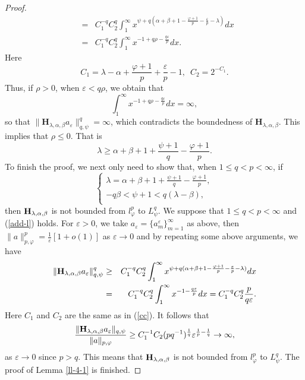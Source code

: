 \documentclass[10pt]{amsart}
\theoremstyle{definition}    %
\numberwithin{equation}{section}
\begin{document}
\begin{proof}
\begin{eqnarray}
&=&  C_1^{-q}C_2^{q}\int_{1}^{\infty}x^{\psi+q(\alpha+\beta+1-\frac{\varphi+1}{p}-\frac{\varepsilon}{p}-\lambda)}dx  \nonumber \\
&=& C_1^{-q}C_2^{q}\int_{1}^{\infty}x^{-1+q\rho-\frac{q\varepsilon}{p}}dx. \nonumber
\end{eqnarray}
Here \begin{equation}\label{cc}C_1=\lambda-\alpha+\frac{\varphi+1}{p}+\frac{\varepsilon}{p}-1, \,\,\, C_2=2^{-C_1}.\end{equation}
Thus, if $\rho>0$, when $\varepsilon<q\rho$, we obtain that $$\int_{1}^{\infty}x^{-1+q\rho-\frac{q\varepsilon}{p}}dx=\infty,$$
so that $\|\mathbf{H}_{\lambda, \alpha, \beta}a_{\varepsilon}\|_{q,\psi}^q=\infty$, which contradicts the boundedness of $\mathbf{H}_{\lambda, \alpha, \beta}$. This implies that $\rho\leq 0$. That is
$$\lambda\geq \alpha+\beta+1+\frac{\psi+1}{q}-\frac{\varphi+1}{p}.$$
To finish the proof, we next only need to show that, when $1\leq q<p<\infty$, if \begin{equation}\label{add-l} 
\begin{cases}
\lambda=\alpha+\beta+1+\frac{\psi+1}{q}-\frac{\varphi+1}{p}, \\
-q\beta<\psi+1<q(\lambda-\beta),\\ 
\end{cases}
\end{equation}  
then ${\bf H}_{\lambda, \alpha, \beta}$ is not bounded from $l_{\varphi}^p$ to $L_{\psi}^q$. We suppose that $1\leq q<p<\infty$ and (\ref{add-l}) holds. For $\varepsilon>0$, we take $a_{\varepsilon}=\{a_m^{\varepsilon}\}_{m=1}^{\infty}$ as above, then $\|a\|_{p, \varphi}^p=\frac{1}{\varepsilon}[1+o(1)]$ as $\varepsilon \rightarrow 0$ and by repeating some above arguments, we have
\begin{eqnarray}\label{h-3}\|{\bf H}_{\lambda, \alpha, \beta}a_{\varepsilon}\|_{q,\psi}^q&\geq&  C_1^{-q}C_2^{q}\int_{1}^{\infty}x^{\psi+q(\alpha+\beta+1-\frac{\varphi+1}{p}-\frac{\varepsilon}{p}-\lambda)}dx  \nonumber \\
&=& C_1^{-q}C_2^{q}\int_{1}^{\infty}x^{-1-\frac{q\varepsilon}{p}}dx=C_1^{-q}C_2^{q}\frac{p}{q\varepsilon}. \nonumber
\end{eqnarray}
Here $C_1$ and $C_2$ are the same as in (\ref{cc}). It follows that
\begin{eqnarray}
\frac{\|{\bf H}_{\lambda, \alpha, \beta}a_{\varepsilon}\|_{q,\psi}}{\|a\|_{p, \varphi}}\geq C_1^{-1}C_2(pq^{-1})^{\frac{1}{q}}\varepsilon^{\frac{1}{p}-\frac{1}{q}}\rightarrow \infty, \nonumber 
\end{eqnarray}
as $\varepsilon \rightarrow 0$ since $p>q$. This means that ${\bf H}_{\lambda, \alpha, \beta}$ is not bounded from $l_{\varphi}^p$ to $L_{\psi}^q$. The proof of Lemma \ref{ll-4-1} is finished.
\end{proof}
\end{document}
